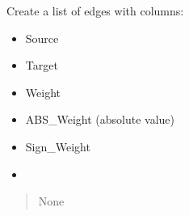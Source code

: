 \documentclass[letterpaper,10pt,english]{sphinxmanual}
\begin{document}
\begin{fulllineitems}
\begin{fulllineitems}
\end{fulllineitems}


\begin{fulllineitems}
\label{\detokenize{friendlynets:friendlyNet.friendlyNet.make_edge_list}}
\pysigstartsignatures
{}
\pysigstopsignatures
\sphinxAtStartPar
Create a list of edges with columns:
\begin{itemize}
\item {} 
\sphinxAtStartPar
Source

\item {} 
\sphinxAtStartPar
Target

\item {} 
\sphinxAtStartPar
Weight

\item {} 
\sphinxAtStartPar
ABS\_Weight (absolute value)

\item {} 
\sphinxAtStartPar
Sign\_Weight

\end{itemize}

\sphinxAtStartPar
{}
\begin{itemize}
\item {} 
\sphinxAtStartPar
{\hyperref[\detokenize{friendlynets:friendlyNet.friendlyNet.EdgeList}]{}}

\end{itemize}
\begin{quote}\begin{description}
\sphinxAtStartPar
None

\end{description}\end{quote}

\end{fulllineitems}



\end{fulllineitems}
\end{document}
